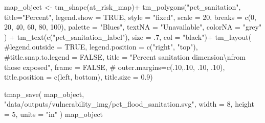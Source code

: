 \documentclass[
  letterpaper,
  DIV=11,
  numbers=noendperiod]{scrartcl}
\newenvironment{Shaded}{}{}
\newcommand{\AttributeTok}[1]{\textcolor[rgb]{0.84,0.23,0.29}{#1}}
\newcommand{\CommentTok}[1]{\textcolor[rgb]{0.42,0.45,0.49}{#1}}
\newcommand{\ConstantTok}[1]{\textcolor[rgb]{0.00,0.36,0.77}{#1}}
\newcommand{\DecValTok}[1]{\textcolor[rgb]{0.00,0.36,0.77}{#1}}
\newcommand{\FloatTok}[1]{\textcolor[rgb]{0.00,0.36,0.77}{#1}}
\newcommand{\FunctionTok}[1]{\textcolor[rgb]{0.44,0.26,0.76}{#1}}
\newcommand{\NormalTok}[1]{\textcolor[rgb]{0.14,0.16,0.18}{#1}}
\newcommand{\OtherTok}[1]{\textcolor[rgb]{0.44,0.26,0.76}{#1}}
\newcommand{\SpecialCharTok}[1]{\textcolor[rgb]{0.00,0.36,0.77}{#1}}
\newcommand{\StringTok}[1]{\textcolor[rgb]{0.01,0.18,0.38}{#1}}
\begin{document}
\begin{Shaded}
\begin{Highlighting}[]
\NormalTok{map\_object }\OtherTok{\textless{}{-}}
\FunctionTok{tm\_shape}\NormalTok{(at\_risk\_map)}\SpecialCharTok{+}
  \FunctionTok{tm\_polygons}\NormalTok{(}\StringTok{"pct\_sanitation"}\NormalTok{,}
              \AttributeTok{title=}\StringTok{"Percent"}\NormalTok{, }
              \AttributeTok{legend.show =} \ConstantTok{TRUE}\NormalTok{,}
              \AttributeTok{style =} \StringTok{"fixed"}\NormalTok{,}
              \AttributeTok{scale =} \DecValTok{20}\NormalTok{,}
              \AttributeTok{breaks =} \FunctionTok{c}\NormalTok{(}\DecValTok{0}\NormalTok{, }\DecValTok{20}\NormalTok{, }\DecValTok{40}\NormalTok{, }\DecValTok{60}\NormalTok{, }\DecValTok{80}\NormalTok{, }\DecValTok{100}\NormalTok{),}
              \AttributeTok{palette =} \StringTok{"Blues"}\NormalTok{,}
              \AttributeTok{textNA =} \StringTok{"Unavailable"}\NormalTok{,}
              \AttributeTok{colorNA =} \StringTok{"grey"}
\NormalTok{              ) }\SpecialCharTok{+}
  \FunctionTok{tm\_text}\NormalTok{(}\FunctionTok{c}\NormalTok{(}\StringTok{"pct\_sanitation\_label"}\NormalTok{), }\AttributeTok{size =}\NormalTok{ .}\DecValTok{7}\NormalTok{, }\AttributeTok{col =} \StringTok{"black"}\NormalTok{)}\SpecialCharTok{+}
  \FunctionTok{tm\_layout}\NormalTok{(}
    \CommentTok{\#legend.outside = TRUE,}
    \AttributeTok{legend.position =} \FunctionTok{c}\NormalTok{(}\StringTok{"right"}\NormalTok{, }\StringTok{"top"}\NormalTok{),}
    \CommentTok{\#title.snap.to.legend = FALSE,}
    \AttributeTok{title =} 
      \StringTok{"Percent sanitation dimension}\SpecialCharTok{\textbackslash{}n}\StringTok{from those exposed"}\NormalTok{,}
    \AttributeTok{frame =} \ConstantTok{FALSE}\NormalTok{,}
\CommentTok{\#            outer.margins=c(.10,.10, .10, .10), }
            \AttributeTok{title.position =} \FunctionTok{c}\NormalTok{(}\StringTok{\textquotesingle{}left\textquotesingle{}}\NormalTok{, }\StringTok{\textquotesingle{}bottom\textquotesingle{}}\NormalTok{),}
            \AttributeTok{title.size =} \FloatTok{0.9}\NormalTok{)}

\FunctionTok{tmap\_save}\NormalTok{(}
\NormalTok{  map\_object,}
  \StringTok{"data/outputs/vulnerability\_img/pct\_flood\_sanitation.svg"}\NormalTok{,}
  \AttributeTok{width =} \DecValTok{8}\NormalTok{,}
  \AttributeTok{height =} \DecValTok{5}\NormalTok{,}
  \AttributeTok{units =} \StringTok{"in"}
\NormalTok{)}
\NormalTok{map\_object}
\end{Highlighting}
\end{Shaded}
\end{document}

